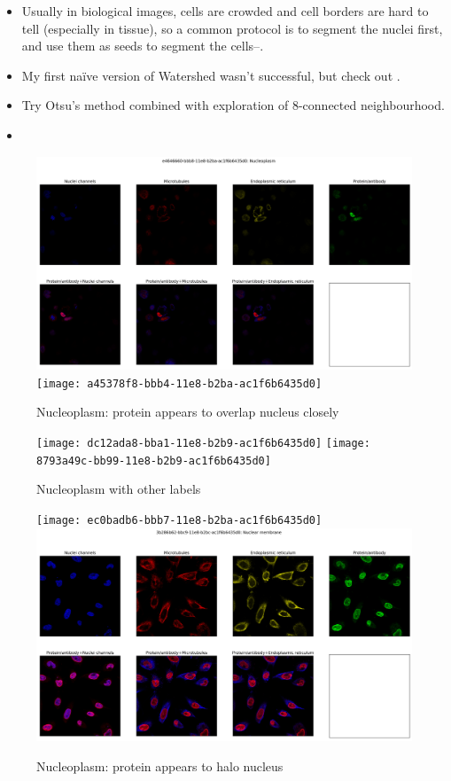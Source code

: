 \documentclass[]{article}
\begin{document}
\begin{itemize}
	\item Usually in biological images, cells are crowded and cell borders are hard to tell (especially in tissue), so a common protocol is to segment the nuclei first, and use them as seeds to segment the cells--\cite{liao2021ground}.
	\item My first na\"ive version of Watershed wasn't successful, but check out \cite{najman1994watershed}.
	\item Try Otsu's method \cite{otsu1979threshold} combined with exploration of 8-connected neighbourhood.
	 \cite{win2018comparative}
	\item \cite{jo2021puzzle}
\end{itemize}

\begin{figure}
	\caption[Nucleoplasm: protein appears to overlap nucleus closely]{Nucleoplasm: protein appears to overlap nucleus closely}
	\includegraphics[width=\textwidth]{e4646660-bbb8-11e8-b2ba-ac1f6b6435d0}
	\texttt{[image: a45378f8-bbb4-11e8-b2ba-ac1f6b6435d0]}
\end{figure}

\begin{figure}
	\caption[Nucleoplasm with other labels]{Nucleoplasm with other labels}
	\texttt{[image: dc12ada8-bba1-11e8-b2b9-ac1f6b6435d0]}
	\texttt{[image: 8793a49c-bb99-11e8-b2b9-ac1f6b6435d0]}
\end{figure}

\begin{figure}
	\caption[Nuclear Membrane: protein appears to halo nucleus]{Nucleoplasm: protein appears to halo nucleus}
	\texttt{[image: ec0badb6-bbb7-11e8-b2ba-ac1f6b6435d0]}
	\includegraphics[width=\textwidth]{3b286b62-bbc9-11e8-b2bc-ac1f6b6435d0}
\end{figure}
\end{document}
